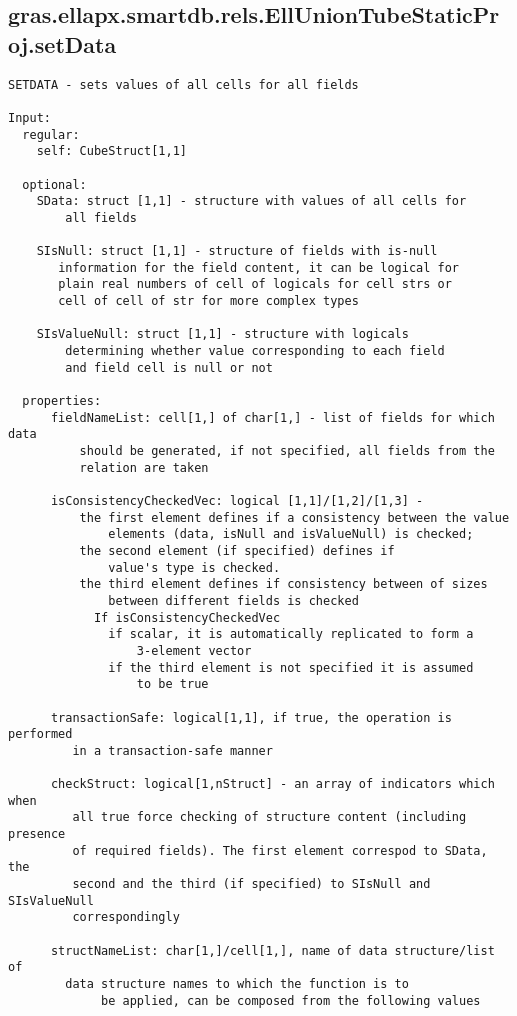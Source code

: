 \subsection{\texorpdfstring{gras.ellapx.smartdb.rels.EllUnionTubeStaticProj.setData}{setData}}\label{method:gras.ellapx.smartdb.rels.EllUnionTubeStaticProj.setData}
\begin{verbatim}
SETDATA - sets values of all cells for all fields

Input:
  regular:
    self: CubeStruct[1,1]

  optional:
    SData: struct [1,1] - structure with values of all cells for
        all fields

    SIsNull: struct [1,1] - structure of fields with is-null
       information for the field content, it can be logical for
       plain real numbers of cell of logicals for cell strs or
       cell of cell of str for more complex types

    SIsValueNull: struct [1,1] - structure with logicals
        determining whether value corresponding to each field
        and field cell is null or not

  properties:
      fieldNameList: cell[1,] of char[1,] - list of fields for which data
          should be generated, if not specified, all fields from the
          relation are taken

      isConsistencyCheckedVec: logical [1,1]/[1,2]/[1,3] -
          the first element defines if a consistency between the value
              elements (data, isNull and isValueNull) is checked;
          the second element (if specified) defines if
              value's type is checked.
          the third element defines if consistency between of sizes
              between different fields is checked
            If isConsistencyCheckedVec
              if scalar, it is automatically replicated to form a
                  3-element vector
              if the third element is not specified it is assumed
                  to be true

      transactionSafe: logical[1,1], if true, the operation is performed
         in a transaction-safe manner

      checkStruct: logical[1,nStruct] - an array of indicators which when
         all true force checking of structure content (including presence
         of required fields). The first element correspod to SData, the
         second and the third (if specified) to SIsNull and SIsValueNull
         correspondingly

      structNameList: char[1,]/cell[1,], name of data structure/list of
        data structure names to which the function is to
             be applied, can be composed from the following values


\end{verbatim}
